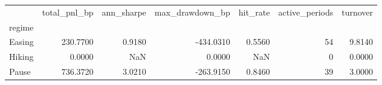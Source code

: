 \begin{tabular}{lrrrrrr}
\toprule
 & total\_pnl\_bp & ann\_sharpe & max\_drawdown\_bp & hit\_rate & active\_periods & turnover \\
regime &  &  &  &  &  &  \\
\midrule
Easing & 230.7700 & 0.9180 & -434.0310 & 0.5560 & 54 & 9.8140 \\
Hiking & 0.0000 & NaN & 0.0000 & NaN & 0 & 0.0000 \\
Pause & 736.3720 & 3.0210 & -263.9150 & 0.8460 & 39 & 3.0000 \\
\bottomrule
\end{tabular}
